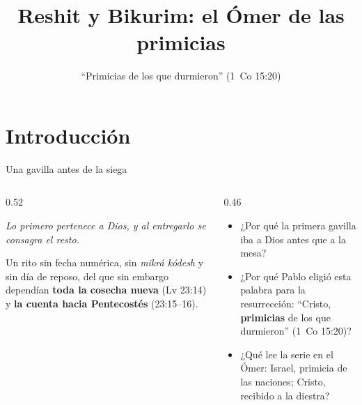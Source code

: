 \documentclass[hyperref={bookmarks=false},aspectratio=169]{beamer}
\title[Primicias]{\bfseries{Reshit y Bikurim: el Ómer de las primicias}}
\subtitle{``Primicias de los que durmieron'' (1~Co 15:20)}
\author{}\institute{}\date{}
\newcommand{\destacar}[1]{\textbf{\textcolor{tierraroja}{#1}}}
\begin{document}
\frame{\titlepage}


\section{Introducción}

\begin{frame}{Una gavilla antes de la siega}
\begin{columns}[c,onlytextwidth]
\begin{column}{0.52\textwidth}
\begin{tcolorbox}[colback=papiro,colframe=tierraroja,boxrule=1.2pt,arc=3pt]
\centering\itshape Lo primero pertenece a Dios, y al entregarlo se consagra el resto.
\end{tcolorbox}
\small\RaggedRight Un rito sin fecha numérica, sin \emph{mikrá kódesh} y sin día de reposo, del que sin embargo dependían \destacar{toda la cosecha nueva} (Lv 23:14) y \destacar{la cuenta hacia Pentecostés} (23:15--16).
\end{column}
\begin{column}{0.46\textwidth}\small
\begin{itemize}
\item ¿Por qué la primera gavilla iba a Dios antes que a la mesa?
\item ¿Por qué Pablo eligió esta palabra para la resurrección: ``Cristo, \destacar{primicias} de los que durmieron'' (1~Co 15:20)?
\item ¿Qué lee la serie en el Ómer: Israel, primicia de las naciones; Cristo, recibido a la diestra?
\end{itemize}
\end{column}
\end{columns}
\end{frame}
\end{document}
